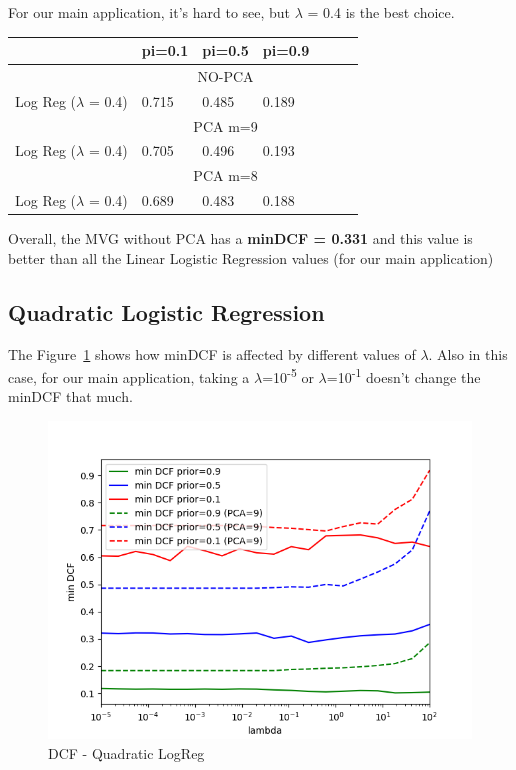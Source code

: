 \documentclass[english]{report}
\begin{document}
For our main application, it's hard to see, but $\lambda$ = 0.4 is the best choice.

\begin{table}[H]
    \centering
    \begin{tabular}{lllllll}
        \toprule
                                & pi=0.1 & pi=0.5 & pi=0.9 \\ \midrule
                                & \multicolumn{3}{c}{NO-PCA}  \\
    Log Reg ($\lambda$ = 0.4)   & 0.715      & 0.485      & 0.189  \\ \midrule
                                & \multicolumn{3}{c}{PCA m=9}  \\
    Log Reg ($\lambda$ = 0.4)   & 0.705      & 0.496       & 0.193 \\ \midrule
                                & \multicolumn{3}{c}{PCA m=8}  \\
    Log Reg ($\lambda$ = 0.4)   & 0.689       & 0.483       & 0.188 \\
    \bottomrule
    \end{tabular}
    \label{tab:LinearLogReg_valid}
\end{table}

Overall, the MVG without PCA has a \textbf{minDCF = 0.331} and this value is better than all
the Linear Logistic Regression values (for our main application)

\clearpage

\subsection{Quadratic Logistic Regression}

The Figure~\ref{fig:DCF_QuadLogReg_valid} shows how minDCF is affected by different values of $\lambda$.
Also in this case, for our main application, taking a $\lambda$=10\textsuperscript{-5} or $\lambda$=10\textsuperscript{-1}
doesn't change the minDCF that much.

\begin{figure}[H]
    \centering
    \includegraphics[scale=0.5]{../../images/validation/QUAD_LR_PCA_minDCF_comparison}
    \caption{DCF - Quadratic LogReg}
    \label{fig:DCF_QuadLogReg_valid}
\end{figure}
\end{document}

